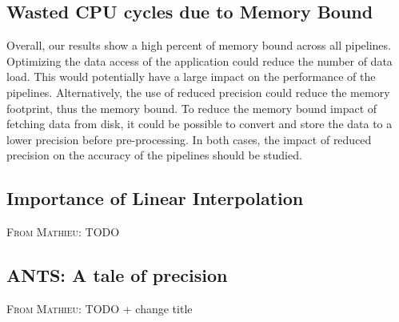\documentclass[conference]{IEEEtran}
\newcommand{\MD}[1]{\color{magenta}\textsc{From Mathieu: }#1\color{black}}
\begin{document}
\subsection{Wasted CPU cycles due to Memory Bound}
Overall, our results show a high percent of memory bound across all pipelines.
Optimizing the data access of the application could reduce the number of data load. This would potentially have a large impact on the performance of the pipelines. Alternatively, the use of reduced precision could reduce the memory footprint, thus the memory bound. To reduce the memory bound impact of fetching data from disk, it could be possible to convert and store the data to a lower precision before pre-processing. In both cases, the impact of reduced precision on the accuracy of the pipelines should be studied.
			
			
\subsection{Importance of Linear Interpolation}
\MD{TODO}
			

\subsection{ANTS: A tale of precision}
\MD{TODO + change title}
\end{document}
